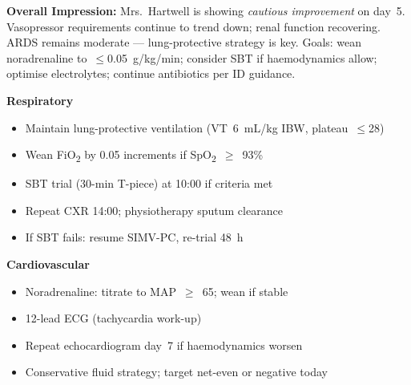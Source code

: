 \documentclass[11pt,a4paper]{scrartcl}
\begin{document}
\noindent
\begin{tcolorbox}[planbox, title={\faPen\enspace Assessment \& Plan — Dr.\ Sandra Osei-Bonsu}]
  \footnotesize\sffamily

  \textbf{\color{MedGold}Overall Impression:}\enspace
  Mrs.~Hartwell is showing \textit{cautious improvement} on day~5.
  Vasopressor requirements continue to trend down; renal function recovering.
  ARDS remains moderate — lung-protective strategy is key. Goals: wean
  noradrenaline to~$\leq$0.05~\textmu{}g/kg/min; consider SBT if haemodynamics
  allow; optimise electrolytes; continue antibiotics per ID guidance.

  \vspace{6pt}

  \noindent
  \begin{minipage}[t]{0.47\linewidth}
    \textbf{\color{MedMid}Respiratory}\par
    \begin{itemize}[leftmargin=12pt, itemsep=1pt, topsep=2pt]
      \item Maintain lung-protective ventilation (VT~6~mL/kg IBW, plateau~$\leq$28)
      \item Wean FiO\textsubscript{2} by 0.05 increments if SpO\textsubscript{2}~$\geq$~93\%
      \item SBT trial (30-min T-piece) at 10:00 if criteria met
      \item Repeat CXR 14:00; physiotherapy sputum clearance
      \item If SBT fails: resume SIMV-PC, re-trial 48~h
    \end{itemize}

    \vspace{4pt}
    \textbf{\color{MedMid}Cardiovascular}\par
    \begin{itemize}[leftmargin=12pt, itemsep=1pt, topsep=2pt]
      \item Noradrenaline: titrate to MAP~$\geq$~65; wean if stable
      \item 12-lead ECG (tachycardia work-up)
      \item Repeat echocardiogram day~7 if haemodynamics worsen
      \item Conservative fluid strategy; target net-even or negative today
    \end{itemize}


\end{minipage}
\end{tcolorbox}
\end{document}
